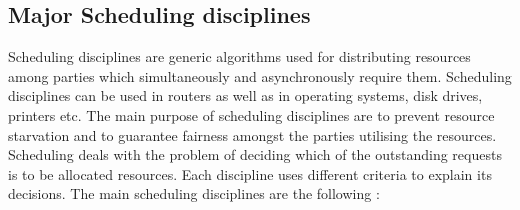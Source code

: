 \documentclass[diploma]{Styles/softlab-thesis}
\begin{document}
\subsection{Major Scheduling disciplines}

Scheduling disciplines are generic algorithms used for distributing resources among parties which simultaneously and asynchronously require them. Scheduling disciplines can be used in routers as well as in operating systems, disk drives, printers etc. The main purpose of scheduling disciplines are to prevent resource starvation and to guarantee fairness amongst the parties utilising the resources. Scheduling deals with the problem of deciding which of the outstanding requests is to be allocated resources. Each discipline uses different criteria to explain its decisions. The main scheduling disciplines are the following : \\
\end{document}
